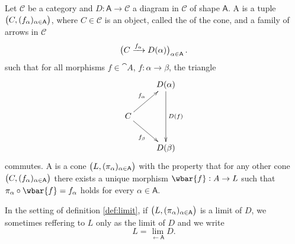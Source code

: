 \begin{definition}
	Let $\mathcal{C}$ be a category and $D : \mathsf{A} \to \mathcal{C}$ a diagram in $\mathcal{C}$ of shape $\mathsf{A}$. A  is a tuple $\del[1]{C,(f_\alpha)_{\alpha \in \mathsf{A}}}$, where $C \in \mathcal{C}$ is an object, called the  of the cone, and a family of arrows in $\mathcal{C}$
	\begin{equation}
		\del[1]{C \xrightarrow{f_\alpha} D(\alpha)}_{\alpha \in \mathsf{A}}.
	\end{equation}
	\noindent such that for all morphisms $f \in \cat{A}$, $f : \alpha \to \beta$, the triangle
	\begin{equation*}
		\xymatrix{
			& D(\alpha) \ar[dd]^{D(f)}\\
			C \ar[ur]^{f_\alpha}\ar[dr]_{f_\beta}\\
			& D(\beta)}
	\end{equation*}
	\noindent commutes. A  is a cone $\del[1]{L, (\pi_\alpha)_{\alpha \in \mathsf{A}}}$ with the property that for any other cone $\del[1]{C,(f_\alpha)_{\alpha \in \mathsf{A}}}$ there exists a unique morphism $\wbar{f} : A \to L$ such that $\pi_\alpha \circ \wbar{f} = f_\alpha$ holds for every $\alpha \in \mathsf{A}$.
	\label{def:limit}
\end{definition}

\begin{remark}
	In the setting of definition \ref{def:limit}, if $\del[1]{L, (\pi_\alpha)_{\alpha \in \cat{A}}}$ is a limit of $D$, we sometimes reffering to $L$ only as the limit of $D$ and we write
	\begin{equation}
		L = \lim_{\leftarrow \mathsf{A}} D.
	\end{equation}
\end{remark}
